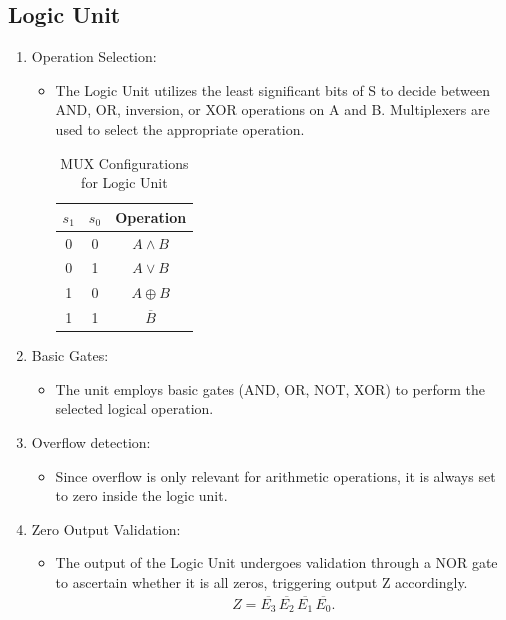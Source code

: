 \documentclass{article}
\begin{document}
\subsection{Logic Unit}
\begin{enumerate}
  \item Operation Selection: 
    \begin{itemize}
      \item The Logic Unit utilizes the least significant bits of S to decide
        between AND, OR, inversion, or XOR operations on A and B. Multiplexers
        are used to select the appropriate operation.
        \begin{table}[htpb]
          \caption{MUX Configurations for Logic Unit}
          \begin{center}
            \begin{tabular}{c|c|c}
              \hline
              \( s_{1} \) & \( s_{0} \) & Operation \\
              \hline
              0 & 0 & \( A \land B \) \\
              0 & 1 & \( A \lor B \) \\
              1 & 0 & \( A \oplus B \) \\
              1 & 1 & \( \overline{B} \) \\
              \hline
            \end{tabular}
          \end{center}
        \end{table}
        
    \end{itemize}
  \item Basic Gates: 
    \begin{itemize}
      \item The unit employs basic gates (AND, OR, NOT, XOR) to perform the
        selected logical operation. 
    \end{itemize}
  \item Overflow detection:
    \begin{itemize}
      \item Since overflow is only relevant for arithmetic operations, it is
        always set to zero inside the logic unit.
    \end{itemize}
  \item Zero Output Validation: 
    \begin{itemize}
      \item The output of the Logic Unit undergoes validation through a NOR
        gate to ascertain whether it is all zeros, triggering output Z
        accordingly.
        \begin{align*}
          Z =
          \overline{E_{3}}\,\overline{E_{2}}\,\overline{E_{1}}\,\overline{E_{0}}
        .\end{align*}
    \end{itemize}
\end{enumerate}
\end{document}

